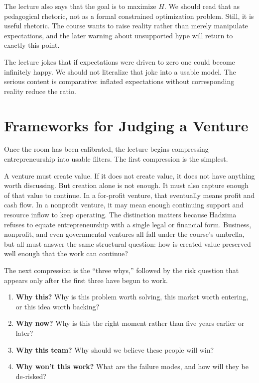 The lecture also says that the goal is to maximize \(H\). We should read that as pedagogical rhetoric, not as a formal constrained optimization problem. Still, it is useful rhetoric. The course wants to raise reality rather than merely manipulate expectations, and the later warning about unsupported hype will return to exactly this point.

\begin{remark}
The lecture jokes that if expectations were driven to zero one could become infinitely happy. We should not literalize that joke into a usable model. The serious content is comparative: inflated expectations without corresponding reality reduce the ratio.
\end{remark}

\section{Frameworks for Judging a Venture}

Once the room has been calibrated, the lecture begins compressing entrepreneurship into usable filters. The first compression is the simplest.

A venture must create value. If it does not create value, it does not have anything worth discussing. But creation alone is not enough. It must also capture enough of that value to continue. In a for-profit venture, that eventually means profit and cash flow. In a nonprofit venture, it may mean enough continuing support and resource inflow to keep operating. The distinction matters because Hadzima refuses to equate entrepreneurship with a single legal or financial form. Business, nonprofit, and even governmental ventures all fall under the course's umbrella, but all must answer the same structural question: how is created value preserved well enough that the work can continue?

The next compression is the ``three whys,'' followed by the risk question that appears only after the first three have begun to work.

\begin{enumerate}
  \item \textbf{Why this?} Why is this problem worth solving, this market worth entering, or this idea worth backing?
  \item \textbf{Why now?} Why is this the right moment rather than five years earlier or later?
  \item \textbf{Why this team?} Why should we believe these people will win?
  \item \textbf{Why won't this work?} What are the failure modes, and how will they be de-risked?
\end{enumerate}

